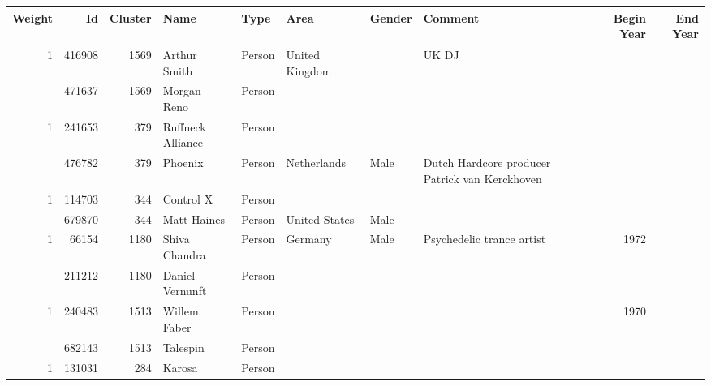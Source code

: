 \begin{tabular}{|r|rrlllllrr|}
\hline
   Weight &     Id &   Cluster & Name              & Type   & Area           & Gender   & Comment                                        &   Begin Year &   End Year \\
\hline
\multirow{2}{*}{1} & 416908 &      1569 & Arthur Smith      & Person & United Kingdom &          & UK DJ                                          &              &            \\
         & 471637 &      1569 & Morgan Reno       & Person &                &          &                                                &              &            \\
\hline
\multirow{2}{*}{1} & 241653 &       379 & Ruffneck Alliance & Person &                &          &                                                &              &            \\
         & 476782 &       379 & Phoenix           & Person & Netherlands    & Male     & Dutch Hardcore producer Patrick van Kerckhoven &              &            \\
\hline
\multirow{2}{*}{1} & 114703 &       344 & Control X         & Person &                &          &                                                &              &            \\
         & 679870 &       344 & Matt Haines       & Person & United States  & Male     &                                                &              &            \\
\hline
\multirow{2}{*}{1} &  66154 &      1180 & Shiva Chandra     & Person & Germany        & Male     & Psychedelic trance artist                      &         1972 &            \\
         & 211212 &      1180 & Daniel Vernunft   & Person &                &          &                                                &              &            \\
\hline
\multirow{2}{*}{1} & 240483 &      1513 & Willem Faber      & Person &                &          &                                                &         1970 &            \\
         & 682143 &      1513 & Talespin          & Person &                &          &                                                &              &            \\
\hline
\multirow{2}{*}{1} & 131031 &       284 & Karosa            & Person &                &          &                                                &              &            \\

\end{tabular}
